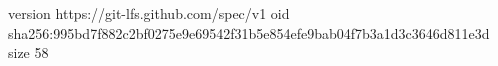 version https://git-lfs.github.com/spec/v1
oid sha256:995bd7f882c2bf0275e9e69542f31b5e854efe9bab04f7b3a1d3c3646d811e3d
size 58
